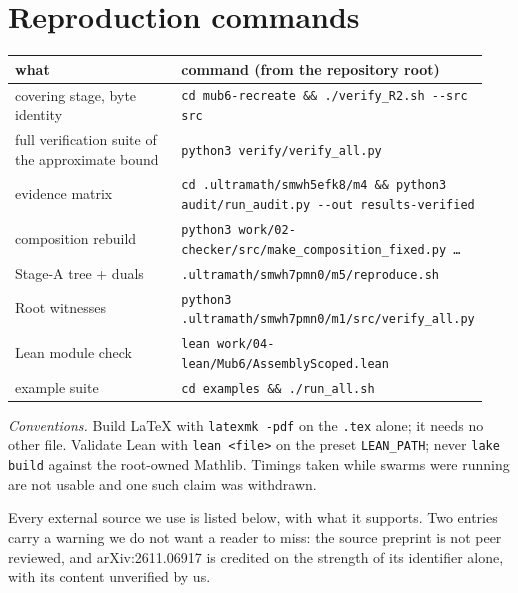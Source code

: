 \documentclass[10pt]{article}
\theoremstyle{definition}
\newcommand{\file}[1]{\texttt{\small #1}}
\begin{document}
\appendix
\section{Reproduction commands}\label{sec:repro}

\begin{center}
\small
\begin{tabular}{@{}p{0.36\linewidth}p{0.58\linewidth}@{}}
\toprule
what & command (from the repository root) \\
\midrule
covering stage, byte identity & \file{cd mub6-\allowbreak{}recreate \&\& ./\allowbreak{}verify\_R2.sh -\allowbreak{}-\allowbreak{}src src} \\
full verification suite of the approximate bound & \file{python3 verify/\allowbreak{}verify\_all.py} \\
evidence matrix & \file{cd .ultramath/\allowbreak{}smwh5efk8/\allowbreak{}m4 \&\& python3 audit/\allowbreak{}run\_audit.py -\allowbreak{}-\allowbreak{}out results-\allowbreak{}verified} \\
composition rebuild & \file{python3 work/\allowbreak{}02-\allowbreak{}checker/\allowbreak{}src/\allowbreak{}make\_composition\_fixed.py \ldots} \\
Stage-A tree + duals & \file{.ultramath/\allowbreak{}smwh7pmn0/\allowbreak{}m5/\allowbreak{}reproduce.sh} \\
Root witnesses & \file{python3 .ultramath/\allowbreak{}smwh7pmn0/\allowbreak{}m1/\allowbreak{}src/\allowbreak{}verify\_all.py} \\
Lean module check & \file{lean work/\allowbreak{}04-\allowbreak{}lean/\allowbreak{}Mub6/\allowbreak{}AssemblyScoped.lean} \\
example suite & \file{cd examples \&\& ./\allowbreak{}run\_all.sh} \\
\bottomrule
\end{tabular}
\end{center}

\noindent\emph{Conventions.} Build LaTeX with \file{latexmk -pdf} on the \file{.tex} alone; it needs no other file. Validate Lean with
\file{lean <file>} on the preset \texttt{LEAN\_PATH}; never \file{lake build} against the root-owned
Mathlib. Timings taken while swarms were running are not usable and one such claim was withdrawn.


\renewcommand{\refname}{Sources credited}
\noindent Every external source we use is listed below, with what it supports. Two entries carry a
warning we do not want a reader to miss: the source preprint is not peer reviewed, and arXiv:2611.06917
is credited on the strength of its identifier alone, with its content unverified by us.
\end{document}
